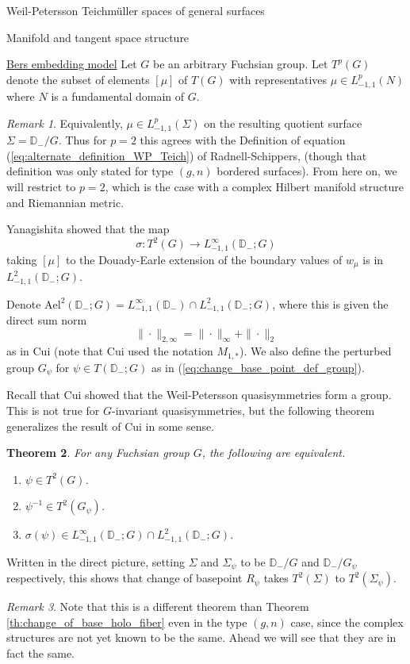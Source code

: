 \documentclass[12pt]{amsart}
\newcommand{\disk}{\ensuremath{\mathbb{D}} } %
\newcommand{\riem}{\Sigma}  %
\theoremstyle{plain}
\newtheorem{theorem}{Theorem}[section]
\theoremstyle{definition}
\theoremstyle{remark}
\newtheorem{remark}[theorem]{Remark}
\numberwithin{equation}{section} %
\numberwithin{figure}{section} %
\begin{document}
\begin{section}{Weil-Petersson Teichm\"uller spaces of general surfaces}
\begin{subsection}{Manifold and tangent space structure}
\begin{subsubsection}{{\underline{Bers embedding model}}}
 Let $G$ be an arbitrary Fuchsian group. 
 Let $T^p(G)$ denote the subset of elements $[\mu]$ of $T(G)$ with representatives $\mu \in L^p_{-1,1}(N)$ where $N$ is a fundamental domain of $G$.  
 \begin{remark}
 Equivalently, $\mu \in L^p_{-1,1}(\riem)$ on the resulting quotient surface $\riem = \disk_- /G$. Thus for $p=2$ this agrees with the Definition of equation (\ref{eq:alternate_definition_WP_Teich}) of Radnell-Schippers, (though that definition was only stated for type $(g,n)$ bordered surfaces).  From here on, we will restrict to $p=2$, which is the case with a complex Hilbert manifold structure and Riemannian metric. 
 \end{remark}
 
 Yanagishita showed that the map 
 \[  \sigma: T^2(G) \rightarrow L^\infty_{-1,1}(\disk_-;G)  \]
 taking $[\mu]$ to the Douady-Earle extension of the boundary values of $w_\mu$ is in $L^2_{-1,1}(\disk_-;G)$.  

 Denote $\mathrm{Ael}^2(\disk_-;G) = L^\infty_{-1,1}(\disk_-) \cap L^2_{-1,1}(\disk_-;G)$, where this is given the direct sum norm 
 \[ \| \cdot \|_{2,\infty} = \| \cdot \|_\infty + \| \cdot \|_2
 \]
 as in Cui (note that Cui used the notation $M_{1,*}$).  We also define the perturbed group $G_\psi$ for $\psi \in T(\disk_-;G)$ as in (\ref{eq:change_base_point_def_group}).
 
 Recall that Cui showed that the Weil-Petersson quasisymmetries form a group. This is not true for $G$-invariant quasisymmetries, but the following theorem generalizes the result of Cui in some sense. 
 \begin{theorem} \cite{Yanagishita}  \label{th:Yana_Douady_Earle_group} For any Fuchsian group $G$,   the following are equivalent.
 \begin{enumerate}[font=\upshape]
 \item
  $\psi \in T^2(G)$.  
 \item $\psi^{-1} \in T^2(G_\psi)$.
 \item $\sigma(\psi) \in L^\infty_{-1,1}(\disk_-;G) \cap L^2_{-1,1}(\disk_-;G)$.  
 \end{enumerate}
 \end{theorem} 
 Written in the direct picture, setting $\riem$ and $\riem_\psi$ to be $\disk_-/G$ and $\disk_-/G_\psi$ respectively, this shows that change of basepoint $R_\psi$ takes $T^2(\riem)$ to $T^2(\riem_\psi)$. 
 \begin{remark}
 Note that this is a different theorem than Theorem \ref{th:change_of_base_holo_fiber} even in the type $(g,n)$ case, since the complex structures are not yet known to be the same. Ahead we will see that they are in fact the same. 
 \end{remark}


\end{subsubsection}
\end{subsection}
\end{section}
\end{document}
